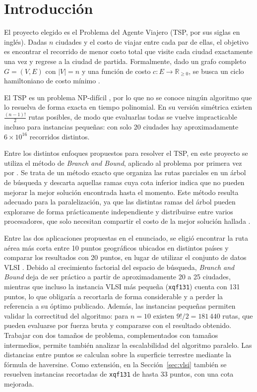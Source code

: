 \documentclass[12pt,a4paper]{article}
\begin{document}
\vspace{0.5cm}

\section{Introducción}

El proyecto elegido es el Problema del Agente Viajero (TSP, por sus siglas en inglés). Dadas $n$ ciudades y el costo de viajar entre cada par de ellas, el objetivo es encontrar
el recorrido de menor costo total que visite cada ciudad exactamente una vez y regrese a la ciudad de partida. Formalmente, dado un grafo completo $G=(V,E)$ con $|V|=n$ y una función de costo $c: E \rightarrow \mathbb{R}_{\geq 0}$, se busca un ciclo hamiltoniano de costo mínimo \citep{applegate2006tsp}.

El TSP es un problema NP-difícil \citep{garey1979computers}, por lo que no se conoce ningún algoritmo que lo resuelva de forma exacta en tiempo polinomial. En su versión simétrica existen $\frac{(n-1)!}{2}$ rutas posibles, de modo que evaluarlas todas se
vuelve impracticable incluso para instancias pequeñas: con solo 20 ciudades hay aproximadamente $6 \times 10^{16}$ recorridos distintos.

Entre los distintos enfoques propuestos para resolver el TSP, en este proyecto se utiliza el método de \textit{Branch and Bound}, aplicado al problema por primera vez por \citet{little1963algorithm}. Se trata de un método exacto que organiza las rutas parciales en un árbol de búsqueda y descarta aquellas ramas cuya cota inferior indica que no pueden mejorar la mejor solución encontrada hasta el momento. Este método resulta adecuado para la paralelización, ya que las distintas ramas del árbol pueden explorarse de forma prácticamente independiente y distribuirse entre varios procesadores, que solo necesitan compartir el costo de la mejor solución hallada \citep{grama2003introduction}.

Entre las dos aplicaciones propuestas en el enunciado, se eligió encontrar la ruta aérea más corta entre 10 puntos geográficos ubicados en distintos países y comparar los resultados con 20 puntos, en lugar de utilizar el conjunto de datos VLSI \citep{cook_vlsi}. Debido al crecimiento factorial del espacio de búsqueda, \textit{Branch and Bound} deja de ser práctico a partir de aproximadamente 20 a 25 ciudades, mientras que incluso la instancia VLSI más pequeña (\texttt{xqf131}) cuenta con 131 puntos, lo que obligaría a recortarla de forma considerable y a perder la referencia a su óptimo publicado. Además, las instancias pequeñas permiten validar la correctitud del algoritmo: para $n=10$ existen $9!/2 = 181\,440$ rutas, que pueden evaluarse por fuerza bruta y compararse con el resultado obtenido. Trabajar con dos tamaños de problema, complementados con tamaños intermedios, permite también analizar la escalabilidad del algoritmo paralelo. Las distancias entre puntos se calculan sobre la superficie terrestre mediante la fórmula de haversine. Como extensión, en la Sección~\ref{sec:vlsi} también se resuelven instancias recortadas de \texttt{xqf131} de hasta 33 puntos, con una cota mejorada.
\end{document}
